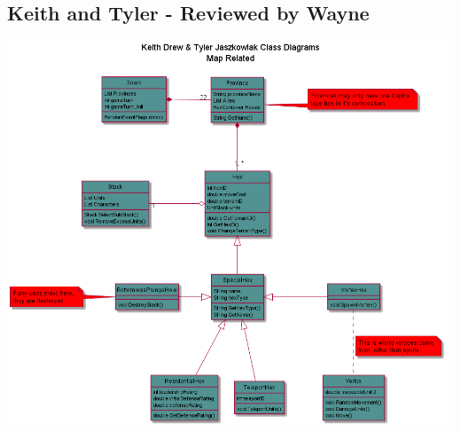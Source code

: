 \documentclass[12pt,a4paper]{article}
\begin{document}
\subsection{Keith and Tyler - Reviewed by Wayne}
\includegraphics[width=\textwidth]{classD}
\end{document}
